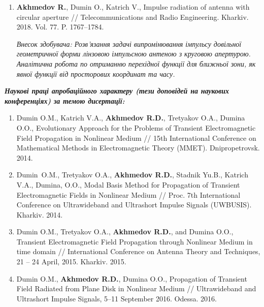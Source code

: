 {\begin{enumerate}
		\item \textbf{Akhmedov R.}, Dumin O., Katrich V., Impulse radiation of antenna 
		with circular aperture // Telecommunications and Radio Engineering. Kharkiv. 
		2018. Vol. 77. P. 1767--1784.
		
		\textit{Внесок здобувача: Розв'язання задачі випромінювання імпульсу довільної
			геометричної форми лінзовою імпульсною антеною з круговою апертурою. Аналітична
			робота по отриманню перехідної функції для ближньої зони, як явної функції 
			від просторових координат та часу.}
		
		\setcounter{ItemsInMyWriting}{\value{enumi}}
	\end{enumerate}
		
	
	\begin{center} 
		\textit{\textbf{Наукові праці апробаційного характеру (тези доповідей на 
				наукових конференціях) за темою дисертації:}}
	\end{center}
	
	\begin{enumerate}
		\setcounter{enumi}{\value{ItemsInMyWriting}}
		
		\item Dumin O.M., Katrich V.A., \textbf{Akhmedov R.D.}, Tretyakov O.A., 
		Dumina O.O., Evolutionary Approach for the Problems of Transient 
		Electromagnetic Field Propagation in Nonlinear Medium // 15th International 
		Conference on Mathematical Methods in Electromagnetic Theory (MMET).
		Dnipropetrovsk. 2014.
		
		\item Dumin O.M., Tretyakov O.A., \textbf{Akhmedov R.D.}, Stadnik Yu.B., 
		Katrich V.A., Dumina, O.O., Modal Basis Method for Propagation of 
		Transient Electromagnetic Fields in Nonlinear Medium // Proc. 7th 
		International Conference on Ultrawideband and Ultrashort Impulse Signals 
		(UWBUSIS). Kharkiv. 2014.
		
		\item Dumin O.M., Tretyakov O.A., \textbf{Akhmedov R.D.}, and Dumina O.O., 
		Transient Electromagnetic Field Propagation through Nonlinear Medium in 
		time domain // International Conference on Antenna Theory and Techniques, 
		21 -- 24 April, 2015. Kharkiv. 2015.
		
		\item Dumin O.M., \textbf{Akhmedov R.D.}, Dumina O.O., Propagation of 
		Transient Field Radiated from Plane Disk in Nonlinear Medium // 
		Ultrawideband and Ultrashort Impulse Signals, 5--11 September 2016. 
		Odessa. 2016.
		

\end{enumerate}}
